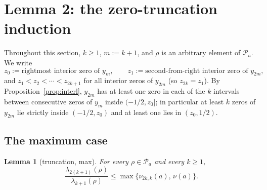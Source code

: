 ﻿\documentclass[11pt]{article}
\newtheorem{lemma}[theorem]{Lemma}
\begin{document}
\section{Lemma 2: the zero-truncation induction}\label{sec:lemma2}

Throughout this section, $k\ge 1$, $m:=k+1$, and $\rho$ is an arbitrary
element of $\mathcal P_a$.  We write
\begin{equation*}
	z_0:=\text{rightmost interior zero of }y_{m},\qquad
	z_1:=\text{second-from-right interior zero of }y_{2m},
\end{equation*}
and $z_1<z_2<\cdots<z_{2k+1}$ for all interior zeros of $y_{2m}$ (so
$z_{2k}=z_1$).  By Proposition~\ref{prop:interl}, $y_{2m}$ has at least one
zero in each of the $k$ intervals between consecutive zeros of $y_m$ inside
$(-1/2,z_0]$; in particular at least $k$ zeros of $y_{2m}$ lie strictly
inside $(-1/2,z_0)$ and at least one lies in $(z_0,1/2)$.

\subsection{The maximum case}

\begin{lemma}[truncation, max]\label{lem:max}
	For every $\rho\in\mathcal P_a$ and every $k\ge 1$,
	\begin{equation*}
		\frac{\lambda_{2(k+1)}(\rho)}{\lambda_{k+1}(\rho)}
		\le\max\bigl\{\nu_{2k,k}(a),\,\nu(a)\bigr\}.
	\end{equation*}
\end{lemma}
\end{document}

